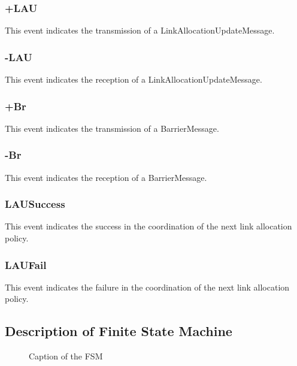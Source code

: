 \subsubsection{+LAU}
This event indicates the transmission of a LinkAllocationUpdateMessage.

\subsubsection{-LAU}
This event indicates the reception of a LinkAllocationUpdateMessage.

\subsubsection{+Br}
This event indicates the transmission of a BarrierMessage.

\subsubsection{-Br}
This event indicates the reception of a BarrierMessage.

\subsubsection{LAUSuccess}
This event indicates the success in the coordination of the next link allocation policy.

\subsubsection{LAUFail}
This event indicates the failure in the coordination of the next link allocation policy.

\newpage

\subsection{Description of Finite State Machine}

\begin{figure}[ht] %
  \centering %
  \caption{Caption of the FSM}
  \label{fig:my_label}
\end{figure}


